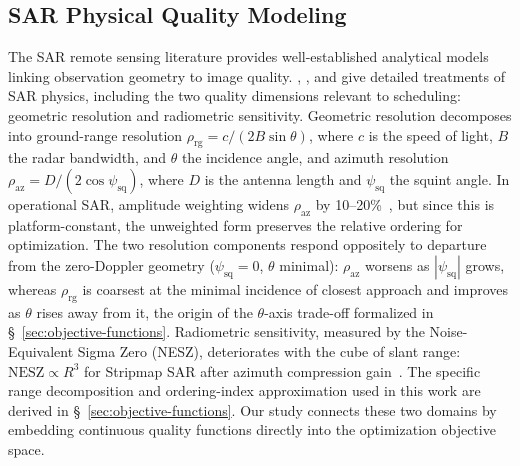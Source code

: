 \documentclass[preprint,12pt,authoryear]{elsarticle}
\begin{document}
\subsection{SAR Physical Quality Modeling}
The SAR remote sensing literature provides well-established analytical
models linking observation geometry to image quality.
\citet{Curlander1991}, \citet{Cumming2005}, and \citet{Moreira2026} give detailed treatments
of SAR physics, including the two quality dimensions relevant to scheduling:
geometric resolution and radiometric sensitivity.
Geometric resolution decomposes into ground-range resolution
$\rho_{\text{rg}} = c / (2B \sin\theta)$, where $c$ is the speed of light,
$B$ the radar bandwidth, and $\theta$ the incidence angle, and azimuth
resolution $\rho_{\text{az}} = D / (2 \cos\psi_{\text{sq}})$, where $D$
is the antenna length and $\psi_{\text{sq}}$ the squint angle. In
operational SAR, amplitude weighting widens $\rho_{\text{az}}$ by
10--20\%~\citep{Curlander1991}, but since this is platform-constant, the
unweighted form preserves the relative ordering for optimization.
The two resolution components respond oppositely to departure from the
zero-Doppler geometry ($\psi_{\text{sq}} = 0$, $\theta$ minimal):
$\rho_{\text{az}}$ worsens as $|\psi_{\text{sq}}|$ grows, whereas
$\rho_{\text{rg}}$ is coarsest at the minimal incidence of closest approach
and improves as $\theta$ rises away from it, the origin of the $\theta$-axis
trade-off formalized in \S~\ref{sec:objective-functions}. Radiometric sensitivity,
measured by the Noise-Equivalent Sigma Zero (NESZ), deteriorates with the
cube of slant range: $\text{NESZ} \propto R^3$ for Stripmap SAR after azimuth compression
gain~\citep{Curlander1991,Moreira2026}. The specific range decomposition and
ordering-index approximation used in this work are derived in
\S~\ref{sec:objective-functions}.
Our study
connects these two domains by embedding continuous quality functions
directly into the optimization objective space.
\end{document}

